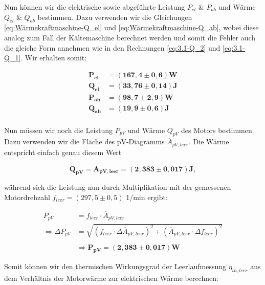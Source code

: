 \documentclass{article}
\begin{document}
Nun können wir die elektrische sowie abgeführte Leistung $P_{el}$ \& $P_{ab}$ und Wärme $Q_{el}$ \& $Q_{ab}$ bestimmen. Dazu verwenden wir die Gleichungen \ref{eq:Wärmekraftmaschine-Q_el} und \ref{eq:Wärmekraftmaschine-Q_ab}, wobei diese analog zum Fall der Kältemaschine berechnet werden und somit die Fehler auch die gleiche Form annehmen wie in den Rechnungen \ref{eq:3.1-Q_2} und \ref{eq:3.1-Q_1}. Wir erhalten somit:

\begin{equation}
    \begin{split}
        \bm{P_{el}} &= \bm{(167,4 \pm 0,6)} \textbf{W} \\
        \bm{Q_{el}} &= \bm{(33,76 \pm 0,14)} \textbf{J} \\
        \bm{P_{ab}} &= \bm{(98,7 \pm 2,9)} \textbf{W} \\
        \bm{Q_{ab}} &= \bm{(19,9 \pm 0,6)} \textbf{J} \\
    \end{split}
\end{equation}

Nun müssen wir noch die Leistung $P_{pV}$ und Wärme $Q_{pV}$ des Motors bestimmen. Dazu verwenden wir die Fläche des pV-Diagramms $\overline{A}_{pV,leer}$. Die Wärme entspricht einfach genau diesem Wert

\begin{equation}
    \bm{Q_{pV}} = \bm{\overline{A}_{pV,leer}} = \bm{(2,383 \pm 0,017)} \textbf{J},
\end{equation}

während sich die Leistung nun durch Multiplikation mit der gemessenen Motordrehzahl $f_{leer} = (297,5 \pm 0,5)$ 1/min ergibt:

\begin{equation}
    \begin{split}
        P_{pV} &= f_{leer} \cdot \overline{A}_{pV,leer} \\
        \Rightarrow \Delta P_{pV} &= \sqrt{(f_{leer} \cdot \Delta \overline{A}_{pV,leer})^2 + (\overline{A}_{pV,leer} \cdot \Delta f_{leer})^2} \\ \\
        &\Rightarrow \bm{P_{pV} = (2,383 \pm 0,017)} \textbf{W}
    \end{split}
\end{equation}

Somit können wir den thermischen Wirkungsgrad der Leerlaufmessung $\eta_{th,leer}$ aus dem Verhältnis der Motorwärme zur elektrischen Wärme berechnen:
\end{document}
